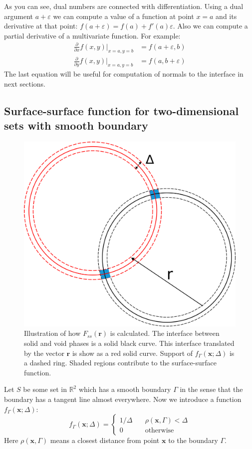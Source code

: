 \documentclass[reprint,amsmath,amssymb,aps,pre,showkeys,showpacs]{revtex4-1}
\begin{document}
As you can see, dual numbers are connected with differentiation. Using a dual
argument $a + \varepsilon$ we can compute a value of a function at point $x = a$
and its derivative at that point:
$f(a + \varepsilon) = f(a) + f'(a)\varepsilon$. Also we can compute a partial
derivative of a multivariate function. For example:
\begin{equation}
  \begin{aligned}
    \frac{\partial}{\partial x} f(x, y) \vert_{x = a, y = b} &= f(a + \varepsilon,
    b) \\
    \frac{\partial}{\partial y} f(x, y) \vert_{x = a, y = b} &= f(a, b +
    \varepsilon)
  \end{aligned}
  \label{eq:autonormals}
\end{equation}
The last equation will be useful for computation of normals to the interface in
next sections.

\subsection{Surface-surface function for two-dimensional sets with smooth boundary}
\label{sec:fss-2d}
\begin{figure}
  \centering
  \includegraphics[width=0.8\linewidth]{images/Fss.png}
  \caption[]{Illustration of how $F_{ss}(\bm{r})$ is calculated. The interface
    between solid and void phases is a solid black curve. This interface
    translated by the vector $\bm{r}$ is show as a red solid curve. Support of
    $f_\Gamma(\bm{x}; \Delta)$ is a dashed ring. Shaded regions contribute to
    the surface-surface function.}
  \label{fig:Fss-explained}
\end{figure}
Let $S$ be some set in $\mathbb{R}^2$ which has a smooth boundary $\Gamma$ in
the sense that the boundary has a tangent line almost everywhere. Now we
introduce a function $f_\Gamma(\bm{x}; \Delta)$:
\begin{equation}
  f_\Gamma(\bm{x}; \Delta) = \left\{
  \begin{array}{ll}
    1/\Delta & \quad \rho(\bm{x}, \Gamma) < \Delta \\
    0 & \quad \text{otherwise}
  \end{array}
  \right. \label{eq:delta-sequence}
\end{equation}
Here $\rho(\bm{x}, \Gamma)$ means a closest distance from point $\bm{x}$ to the
boundary $\Gamma$.
\end{document}
